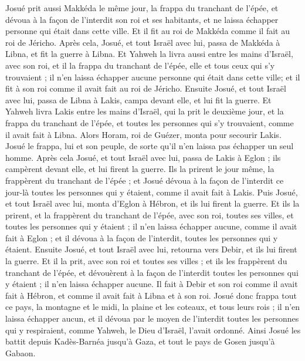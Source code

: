 \begin{multicols}{2}
Josué prit aussi Makkéda le même jour, la frappa du tranchant de l'épée, et dévoua à la façon de l'interdit son roi et ses habitants, et ne laissa échapper personne qui était dans cette ville. Et il fit au roi de Makkéda comme il fait au roi de Jéricho.
Après cela, Josué, et tout Israël avec lui, passa de Makkéda à Libna, et fit la guerre à Libna.
Et Yahweh la livra aussi entre les mains d'Israël, avec son roi, et il la frappa du tranchant de l'épée, elle et tous ceux qui s'y trouvaient ; il n'en laissa échapper aucune personne qui était dans cette ville; et il fit à son roi comme il avait fait au roi de Jéricho.
Ensuite Josué, et tout Israël avec lui, passa de Libna à Lakis, campa devant elle, et lui fit la guerre.
Et Yahweh livra Lakis entre les mains d'Israël, qui la prit le deuxième jour, et la frappa du tranchant de l'épée, et toutes les personnes qui s'y trouvaient, comme il avait fait à Libna.
Alors Horam, roi de Guézer, monta pour secourir Lakis. Josué le frappa, lui et son peuple, de sorte qu'il n'en laissa pas échapper un seul homme.
Après cela Josué, et tout Israël avec lui, passa de Lakis à Eglon ; ils campèrent devant elle, et lui firent la guerre.
Ils la prirent le jour même, la frappèrent du tranchant de l'épée ; et Josué dévoua à la façon de l'interdit ce jour-là toutes les personnes qui y étaient, comme il avait fait à Lakis.
Puis Josué, et tout Israël avec lui, monta d'Eglon à Hébron, et ils lui firent la guerre.
Et ils la prirent, et la frappèrent du tranchant de l'épée, avec son roi, toutes ses villes, et toutes les personnes qui y étaient ; il n'en laissa échapper aucune, comme il avait fait à Eglon ; et il dévoua à la façon de l'interdit, toutes les personnes qui y étaient.
Ensuite Josué, et tout Israël avec lui, retourna vers Debir, et ils lui firent la guerre.
Et il la prit, avec son roi et toutes ses villes ; et ils les frappèrent du tranchant de l'épée, et dévouèrent à la façon de l'interdit toutes les personnes qui y étaient ; il n'en laissa échapper aucune. Il fait à Debir et son roi comme il avait fait à Hébron, et comme il avait fait à Libna et à son roi.
Josué donc frappa tout ce pays, la montagne et le midi, la plaine et les coteaux, et tous leurs rois ; il n'en laissa échapper aucun, et il dévoua par le moyen de l'interdit toutes les personnes qui y respiraient, comme Yahweh, le Dieu d'Israël, l'avait ordonné.
Ainsi Josué les battit depuis Kadès-Barnéa jusqu'à Gaza, et tout le pays de Gosen jusqu'à Gabaon.

\end{multicols}
